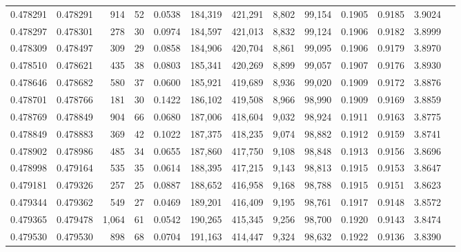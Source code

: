 \begin{tabular}{rrrrrrrrrrrrr}
0.478291 & 0.478291 &   914 &    52 &                                     0.0538 & 184,319 & 421,291 &   8,802 &  99,154 & 0.1905 & 0.9185 & 3.9024 \\
0.478297 & 0.478301 &   278 &    30 &                                     0.0974 & 184,597 & 421,013 &   8,832 &  99,124 & 0.1906 & 0.9182 & 3.8999 \\
0.478309 & 0.478497 &   309 &    29 &                                     0.0858 & 184,906 & 420,704 &   8,861 &  99,095 & 0.1906 & 0.9179 & 3.8970 \\
0.478510 & 0.478621 &   435 &    38 &                                     0.0803 & 185,341 & 420,269 &   8,899 &  99,057 & 0.1907 & 0.9176 & 3.8930 \\
0.478646 & 0.478682 &   580 &    37 &                                     0.0600 & 185,921 & 419,689 &   8,936 &  99,020 & 0.1909 & 0.9172 & 3.8876 \\
0.478701 & 0.478766 &   181 &    30 &                                     0.1422 & 186,102 & 419,508 &   8,966 &  98,990 & 0.1909 & 0.9169 & 3.8859 \\
0.478769 & 0.478849 &   904 &    66 &                                     0.0680 & 187,006 & 418,604 &   9,032 &  98,924 & 0.1911 & 0.9163 & 3.8775 \\
0.478849 & 0.478883 &   369 &    42 &                                     0.1022 & 187,375 & 418,235 &   9,074 &  98,882 & 0.1912 & 0.9159 & 3.8741 \\
0.478902 & 0.478986 &   485 &    34 &                                     0.0655 & 187,860 & 417,750 &   9,108 &  98,848 & 0.1913 & 0.9156 & 3.8696 \\
0.478998 & 0.479164 &   535 &    35 &                                     0.0614 & 188,395 & 417,215 &   9,143 &  98,813 & 0.1915 & 0.9153 & 3.8647 \\
0.479181 & 0.479326 &   257 &    25 &                                     0.0887 & 188,652 & 416,958 &   9,168 &  98,788 & 0.1915 & 0.9151 & 3.8623 \\
0.479344 & 0.479362 &   549 &    27 &                                     0.0469 & 189,201 & 416,409 &   9,195 &  98,761 & 0.1917 & 0.9148 & 3.8572 \\
0.479365 & 0.479478 & 1,064 &    61 &                                     0.0542 & 190,265 & 415,345 &   9,256 &  98,700 & 0.1920 & 0.9143 & 3.8474 \\
0.479530 & 0.479530 &   898 &    68 &                                     0.0704 & 191,163 & 414,447 &   9,324 &  98,632 & 0.1922 & 0.9136 & 3.8390 \\

\end{tabular}
